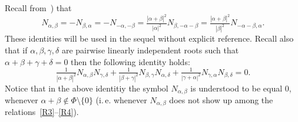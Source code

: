 \documentclass{article}
\numberwithin{equation}{section}
\theoremstyle{definition}
\theoremstyle{remark}
\begin{document}
Recall from~\cite[\S~14]{VP}) that
\begin{equation} \label{eq:sc-ids-sl} N_{\alpha, \beta} = -N_{\beta,\alpha} = - N_{-\alpha, -\beta} = \tfrac{|\alpha+\beta|^2}{|\alpha|^2} N_{\beta, -\alpha-\beta} = \tfrac{|\alpha+\beta|^2}{|\beta|^2} N_{-\alpha-\beta, \alpha}. \end{equation}
These identities will be used in the sequel without explicit reference. 
Recall also that if $\alpha, \beta, \gamma, \delta$ are pairwise linearly independent roots such that $\alpha+\beta+\gamma+\delta = 0$ then the following identity holds:
\begin{equation} \label{eq:cocycle} \tfrac{1}{|\alpha+\beta|^2} N_{\alpha,\beta} N_{\gamma,\delta} + \tfrac{1}{|\beta+\gamma|^2} N_{\beta,\gamma} N_{\alpha,\delta} + \tfrac{1}{|\gamma+\alpha|^2} N_{\gamma,\alpha} N_{\beta,\delta} = 0. \end{equation}
Notice that in the above identitiy the symbol $N_{\alpha,\beta}$ is understood to be equal $0$, whenever $\alpha+\beta\not\in\Phi\setminus\{0\}$ 
 (i.\,e. whenever $N_{\alpha, \beta}$ does not show up among the relations~\eqref{R3}--\eqref{R4}).
\end{document}
